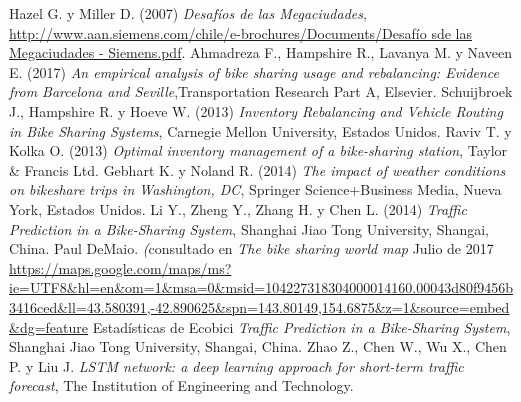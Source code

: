 \documentclass[12pt,spanish]{article}
\begin{document}
	\newpage	
	\begin{thebibliography}{9}
		
		Hazel G. y Miller D. (2007)
		\textit{Desafíos de las Megaciudades},
		\underline{http://www.aan.siemens.com/chile/e-brochures/Documents/Desafío sde las Megaciudades - Siemens.pdf}.
		Ahmadreza F., Hampshire R., Lavanya M. y Naveen E. (2017) \textit{An empirical analysis of bike sharing usage and rebalancing: Evidence from Barcelona and Seville},Transportation Research Part A, Elsevier.
		Schuijbroek J., Hampshire R. y Hoeve W. (2013) \textit{Inventory Rebalancing and Vehicle Routing in Bike	Sharing Systems}, Carnegie Mellon University, Estados Unidos.
		Raviv T. y Kolka O. (2013) \textit{Optimal inventory management of a bike-sharing station}, Taylor \& Francis Ltd.
		Gebhart K. y Noland R. (2014) \textit{The impact of weather conditions on bikeshare trips in Washington, DC}, Springer Science+Business Media, Nueva York, Estados Unidos.
		Li Y., Zheng Y., Zhang H. y Chen L. (2014) \textit{Traffic Prediction in a Bike-Sharing System}, Shanghai Jiao Tong University, Shangai, China.
		Paul DeMaio. \textit(consultado en \textit{The bike sharing world map} Julio de 2017 \underline{https://maps.google.com/maps/ms?ie=UTF8\&hl=en\&om=1\&msa=0\&msid=104227318304000014160.00043d80f9456b3416ced\&ll=43.580391,-42.890625\&spn=143.80149,154.6875\&z=1\&source=embed\&dg=feature}
		Estadísticas de Ecobici \textit{Traffic Prediction in a Bike-Sharing System}, Shanghai Jiao Tong University, Shangai, China.
		Zhao Z., Chen W., Wu X., Chen P. y Liu J. \textit{LSTM network: a deep learning approach for short-term traffic forecast}, The Institution of Engineering and Technology.

	
	\end{thebibliography}
\end{document}
